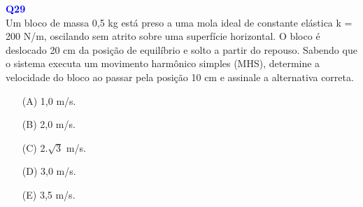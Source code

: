 \documentclass[a4paper,12pt]{article}
\begin{document}
\begin{flushleft}
\textbf{\textcolor{blue}{\Large Q29}}\\

Um bloco de massa 0,5 kg está preso a uma mola
ideal de constante elástica k = 200 N/m, oscilando
sem atrito sobre uma superfície horizontal. O
bloco é deslocado 20 cm da posição de equilíbrio
e solto a partir do repouso. Sabendo que o
sistema executa um movimento harmônico
simples (MHS), determine a velocidade do bloco
ao passar pela posição 10 cm e assinale a
alternativa correta.

\begin{itemize}
\item[(A)] 1,0 m/s.
\item[(B)] 2,0 m/s.
\item[(C)] 2.$\sqrt{3}$ m/s.
\item[(D)] 3,0 m/s.
\item[(E)] 3,5 m/s.
\end{itemize}

\vspace{0.5cm}

\begin{center}


\end{center}
\end{flushleft}
\end{document}
